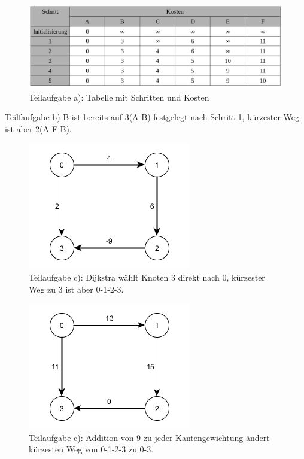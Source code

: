 \documentclass[12pt]{scrartcl}
\begin{document}

\exercise{}
\begin{figure}[h!]
\begin{center}
\includegraphics[scale=0.5]{Dijsktra.png}
\caption{Teilaufgabe a): Tabelle mit Schritten und Kosten}
\end{center}
\end{figure}

Teilfaufgabe b) B ist bereits auf 3(A-B) festgelegt nach Schritt 1, kürzester Weg ist aber 2(A-F-B).


\begin{figure}[h!]
\begin{center}
\includegraphics[scale=0.5]{Dijkstra1.png}
\caption{Teilaufgabe c): Dijkstra wählt Knoten 3 direkt nach 0, kürzester Weg zu 3 ist aber 0-1-2-3.}
\end{center}
\end{figure}

\begin{figure}[h!]
\begin{center}
\includegraphics[scale=0.5]{Dijkstra2.png}
\caption{Teilaufgabe c): Addition von 9 zu jeder Kantengewichtung ändert kürzesten Weg von 0-1-2-3 zu 0-3.}
\end{center}
\end{figure}
\end{document}
